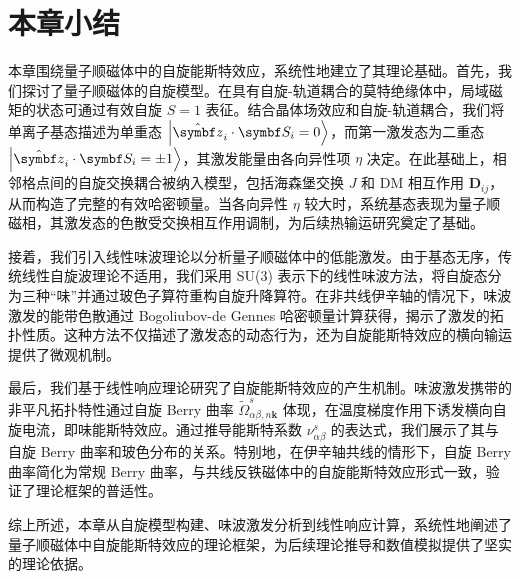    \section{本章小结}
    本章围绕量子顺磁体中的自旋能斯特效应，系统性地建立了其理论基础。首先，我们探讨了量子顺磁体的自旋模型。在具有自旋-轨道耦合的莫特绝缘体中，局域磁矩的状态可通过有效自旋 $S=1$ 表征。结合晶体场效应和自旋-轨道耦合，我们将单离子基态描述为单重态 $\ket{\hat{\bm{z}}_i \cdot \bm{S}_i = 0}$，而第一激发态为二重态 $\ket{\hat{\bm{z}}_i \cdot \bm{S}_i = \pm 1}$，其激发能量由各向异性项 $\eta$ 决定。在此基础上，相邻格点间的自旋交换耦合被纳入模型，包括海森堡交换 $J$ 和 DM 相互作用 $\bm{D}_{ij}$，从而构造了完整的有效哈密顿量。当各向异性 $\eta$ 较大时，系统基态表现为量子顺磁相，其激发态的色散受交换相互作用调制，为后续热输运研究奠定了基础。

    接着，我们引入线性味波理论以分析量子顺磁体中的低能激发。由于基态无序，传统线性自旋波理论不适用，我们采用 SU(3) 表示下的线性味波方法，将自旋态分为三种“味”并通过玻色子算符重构自旋升降算符。在非共线伊辛轴的情况下，味波激发的能带色散通过 Bogoliubov-de Gennes 哈密顿量计算获得，揭示了激发的拓扑性质。这种方法不仅描述了激发态的动态行为，还为自旋能斯特效应的横向输运提供了微观机制。

    最后，我们基于线性响应理论研究了自旋能斯特效应的产生机制。味波激发携带的非平凡拓扑特性通过自旋 Berry 曲率 $\tilde{\Omega}^s_{\alpha\beta,n\bm{k}}$ 体现，在温度梯度作用下诱发横向自旋电流，即味能斯特效应。通过推导能斯特系数 $\nu^s_{\alpha\beta}$ 的表达式，我们展示了其与自旋 Berry 曲率和玻色分布的关系。特别地，在伊辛轴共线的情形下，自旋 Berry 曲率简化为常规 Berry 曲率，与共线反铁磁体中的自旋能斯特效应形式一致，验证了理论框架的普适性。

    综上所述，本章从自旋模型构建、味波激发分析到线性响应计算，系统性地阐述了量子顺磁体中自旋能斯特效应的理论框架，为后续理论推导和数值模拟提供了坚实的理论依据。
